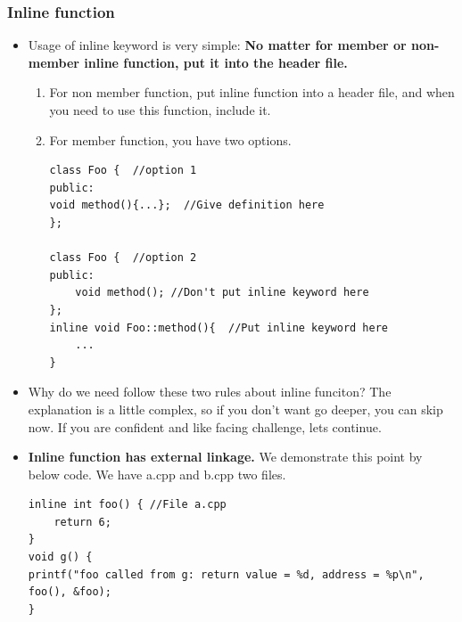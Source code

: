\documentclass[a4paper,11pt,twoside]{book}
\begin{document}
\subsubsection{Inline function}
\begin{itemize}
	\item Usage of inline keyword is very simple: \textbf{No matter for member or non-member inline function, put it into the header file.}
	\begin{enumerate}
		\item For non member function, put inline function into a header file, and when you need to use this function, include it.
		
		\item For member function, you have two options.
\begin{lstlisting}[numbers=none]
class Foo {  //option 1
public:
void method(){...};  //Give definition here
};

class Foo {  //option 2
public:
	void method(); //Don't put inline keyword here
};
inline void Foo::method(){  //Put inline keyword here
	...
}
\end{lstlisting}
	\end{enumerate}
	
	\item Why do we need follow these two rules about inline funciton? The explanation is a little complex, so if you don't want go deeper, you can skip now. If you are confident and like facing challenge, lets continue.
	
	\item \textbf{Inline function has external linkage.} We demonstrate this point by below code. We have a.cpp and b.cpp two files.
\begin{lstlisting}
inline int foo() { //File a.cpp
	return 6;
}
void g() {
printf("foo called from g: return value = %d, address = %p\n", foo(), &foo);
}


\end{lstlisting}
\end{itemize}
\end{document}
